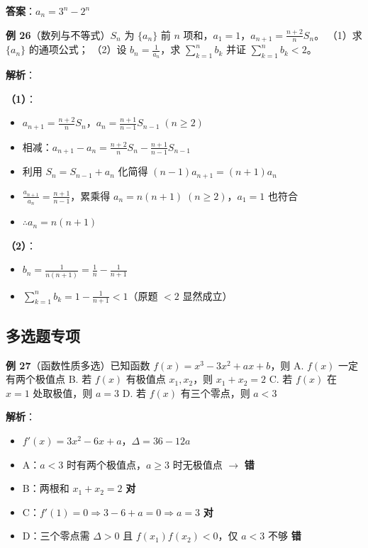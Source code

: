 \textbf{答案}：$a_n=3^n-2^n$

\textbf{例 26}（数列与不等式）$S_n$ 为 $\{a_n\}$ 前 $n$ 项和，$a_1=1$，$a_{n+1}=\frac{n+2}{n}S_n$。
（1）求 $\{a_n\}$ 的通项公式；
（2）设 $b_n=\frac1{a_n}$，求 $\sum_{k=1}^n b_k$ 并证 $\sum_{k=1}^n b_k < 2$。

\textbf{解析}：

\textbf{（1）}：
\begin{itemize}
  \item $a_{n+1}=\frac{n+2}{n}S_n$，$a_n=\frac{n+1}{n-1}S_{n-1}\;(n\ge2)$
  \item 相减：$a_{n+1}-a_n = \frac{n+2}{n}S_n - \frac{n+1}{n-1}S_{n-1}$
  \item 利用 $S_n=S_{n-1}+a_n$ 化简得 $(n-1)a_{n+1}=(n+1)a_n$
  \item $\frac{a_{n+1}}{a_n}=\frac{n+1}{n-1}$，累乘得 $a_n=n(n+1)\;(n\ge2)$，$a_1=1$ 也符合
  \item $\therefore a_n=n(n+1)$
\end{itemize}

\textbf{（2）}：
\begin{itemize}
  \item $b_n=\frac1{n(n+1)}=\frac1n-\frac1{n+1}$
  \item $\sum_{k=1}^n b_k = 1-\frac1{n+1} < 1$（原题 $<2$ 显然成立）
\end{itemize}

\subsection{多选题专项}

\textbf{例 27}（函数性质多选）已知函数 $f(x)=x^3-3x^2+ax+b$，则
A. $f(x)$ 一定有两个极值点
B. 若 $f(x)$ 有极值点 $x_1,x_2$，则 $x_1+x_2=2$
C. 若 $f(x)$ 在 $x=1$ 处取极值，则 $a=3$
D. 若 $f(x)$ 有三个零点，则 $a<3$

\textbf{解析}：
\begin{itemize}
  \item $f'(x)=3x^2-6x+a$，$\Delta=36-12a$
  \item A：$a<3$ 时有两个极值点，$a\ge3$ 时无极值点 $\rightarrow$ \textbf{错}
  \item B：两根和 $x_1+x_2=2$ \textbf{对}
  \item C：$f'(1)=0\Rightarrow3-6+a=0\Rightarrow a=3$ \textbf{对}
  \item D：三个零点需 $\Delta>0$ 且 $f(x_1)f(x_2)<0$，仅 $a<3$ 不够 \textbf{错}
\end{itemize}

